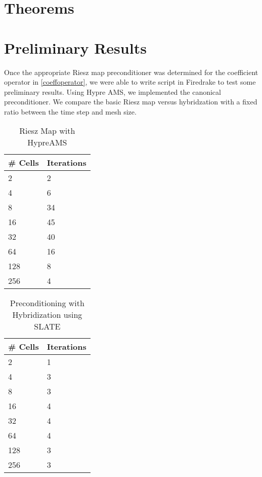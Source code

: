 \documentclass[11pt]{article}
\begin{document}
\section{Theorems}
\section{Preliminary Results}
Once the appropriate Riesz map preconditioner was determined for the coefficient operator in \eqref{coeffoperator}, we were able to write script in Firedrake to test some preliminary results. Using Hypre AMS, we implemented the canonical preconditioner. We compare the basic Riesz map versus hybridzation with a fixed ratio between the time step and mesh size.

\begin{table}[h!]
	\begin{center}
		\caption{Riesz Map with HypreAMS}
		\label{tab:table1}
		\begin{tabular}{l|l}
			\toprule 
			\textbf{\# Cells} & \textbf{Iterations}\\
			\midrule 
			2 & 2 \\
			4 & 6 \\
			8 &34 \\
			16 & 45 \\
			32 & 40 \\
			64 & 16 \\
			128 & 8 \\
			256 & 4 \\
			\bottomrule 
		\end{tabular}
	\end{center}
\end{table}

\begin{table}[h!]
	\begin{center}
		\caption{Preconditioning with Hybridization using SLATE}
		\label{tab:table1}
		\begin{tabular}{l|l}
			\toprule 
			\textbf{\# Cells} & \textbf{Iterations}\\
			\midrule 
			2 & 1 \\
			4 & 3 \\
			8 & 3 \\
			16 & 4 \\
			32 & 4 \\
			64 & 4 \\
			128 & 3 \\
 			256 & 3 \\
			\bottomrule
		\end{tabular}
	\end{center}
\end{table}




 
\end{document}
